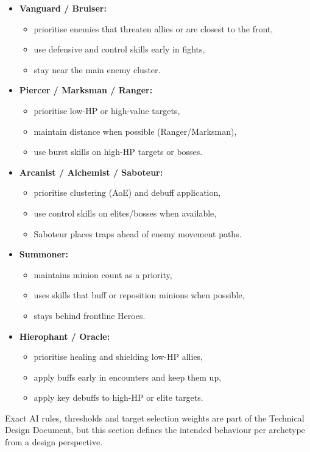 \begin{itemize}
	\item \textbf{Vanguard / Bruiser:} 
	\begin{itemize}
		\item prioritise enemies that threaten allies or are closest to the front,
		\item use defensive and control skills early in fights,
		\item stay near the main enemy cluster.
	\end{itemize}
	\item \textbf{Piercer / Marksman / Ranger:}
	\begin{itemize}
		\item prioritise low-HP or high-value targets,
		\item maintain distance when possible (Ranger/Marksman),
		\item use burst skills on high-HP targets or bosses.
	\end{itemize}
	\item \textbf{Arcanist / Alchemist / Saboteur:}
	\begin{itemize}
		\item prioritise clustering (AoE) and debuff application,
		\item use control skills on elites/bosses when available,
		\item Saboteur places traps ahead of enemy movement paths.
	\end{itemize}
	\item \textbf{Summoner:}
	\begin{itemize}
		\item maintains minion count as a priority,
		\item uses skills that buff or reposition minions when possible,
		\item stays behind frontline Heroes.
	\end{itemize}
	\item \textbf{Hierophant / Oracle:}
	\begin{itemize}
		\item prioritise healing and shielding low-HP allies,
		\item apply buffs early in encounters and keep them up,
		\item apply key debuffs to high-HP or elite targets.
	\end{itemize}
\end{itemize}

Exact AI rules, thresholds and target selection weights are part of the Technical Design Document, 
but this section defines the intended behaviour per archetype from a design perspective.

